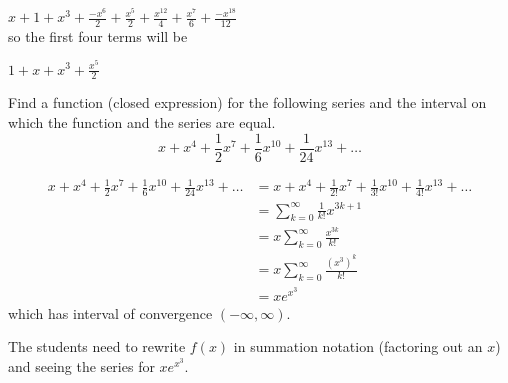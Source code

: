 \documentclass[handout]{ximera}
\begin{document}
\begin{problem}
\begin {freeResponse}
$x + 1 + x^{3} + \frac{-x^{6}}{2} + \frac{x^{5}}{2} + \frac{x^{12}}{4}
+ \frac{x^{7}}{6} + \frac{- x^{18}}{12}$ \\

so the first four terms will be

$\boxed{1 + x + x^{3} + \frac{x^{5}}{2}}$

\end{freeResponse}


\end{problem}



\begin{problem}
Find a function (closed expression) for the following series and the interval on which the function and the series are equal.
	\[
	x + x^4 + \frac{1}{2} x^7 + \frac{1}{6} x^{10} + \frac{1}{24} x^{13} + \hdots
	\]
	\begin{freeResponse}
		\begin{align*}
		x + x^4 + \frac{1}{2} x^7 + \frac{1}{6} x^{10} + \frac{1}{24} x^{13} + \hdots
		&= x + x^4 + \frac{1}{2!} x^7 + \frac{1}{3!} x^{10} + \frac{1}{4!} x^{13} + \hdots  \\
		&= \sum_{k=0}^\infty \frac{1}{k!}x^{3k + 1}  \\
		&= x \sum_{k=0}^\infty \frac{x^{3k}}{k!}  \\
		&= x \sum_{k=0}^\infty \frac{(x^3)^k}{k!}  \\
		&= \boxed{xe^{x^3}}
		\end{align*}
	which has interval of convergence $(- \infty, \infty)$.  
	\end{freeResponse}
		
\end{problem}

\begin{instructorNotes}
The students need to rewrite $f(x)$ in summation notation (factoring out an $x$) and seeing the series for $xe^{x^3}$.  
\end{instructorNotes}
\end{document}
